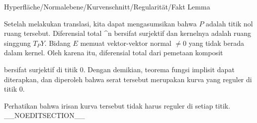 {Hyperfläche/Normalebene/Kurvenschnitt/Regularität/Fakt}
{Lemma}
{}
{

\faktzusatz {}
\faktzusatz {}

}
{

Setelah melakukan translasi, kita dapat mengasumsikan bahwa $P$ adalah titik nol ruang tersebut. Diferensial total
 {\R^n } {\R
} {}
bersifat surjektif dan kernelnya adalah ruang singgung $T_PY$. Bidang $E$ memuat vektor-vektor normal $\neq 0$ yang tidak berada dalam kernel. Oleh karena itu, diferensial total dari pemetaan komposit

 {  }

bersifat surjektif di titik $0$. Dengan demikian, teorema fungsi implisit dapat diterapkan, dan diperoleh bahwa serat tersebut merupakan kurva yang reguler di titik $0$.

}

Perhatikan bahwa irisan kurva tersebut tidak harus reguler di setiap titik.
__NOEDITSECTION__

